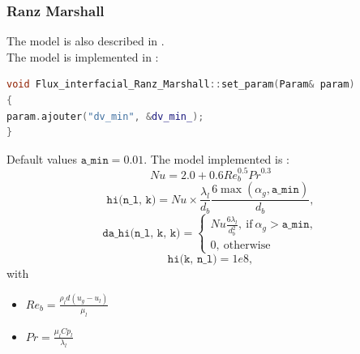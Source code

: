 \subsubsection{Ranz Marshall}
The model is also described in \cite{}.\\
The model is implemented in :
\begin{lstlisting}[language=c++]
void Flux_interfacial_Ranz_Marshall::set_param(Param& param)
{
param.ajouter("dv_min", &dv_min_);
}
\end{lstlisting}
Default values $\texttt{a\_min}= 0.01$.
The model implemented is :
\begin{equation}
  \mathit{Nu} = 2.0 + 0.6 \mathit{Re}_b^{0.5}\mathit{Pr}^{0.3}
\end{equation}
\begin{equation}
    \texttt{hi(n_l, k)} = Nu \times\frac{\lambda_l}{d_b} \frac{6\max(\alpha_g,\texttt{a\_ min})}{d_b},
\end{equation}
\begin{equation}
\texttt{da\_hi(n_l, k, k)} = \begin{cases}
    \mathit{Nu} \frac{6\lambda_l}{d_b^2},\ \text{if}\ \alpha_g> \texttt{a\_ min},\\ 0,\ \text{otherwise}
\end{cases}
\end{equation}
\begin{equation}
\texttt{hi(k, n_l)} = 1e8,
\end{equation}
with
\begin{itemize}
    \item[\small \textcolor{blue}{\ding{109}}]$Re_b=\frac{\rho_l d (u_g-u_l)}{\mu_l}$
    \item[\small \textcolor{blue}{\ding{109}}]$Pr = \frac{\mu_l Cp_l}{\lambda_l}$
\end{itemize}

